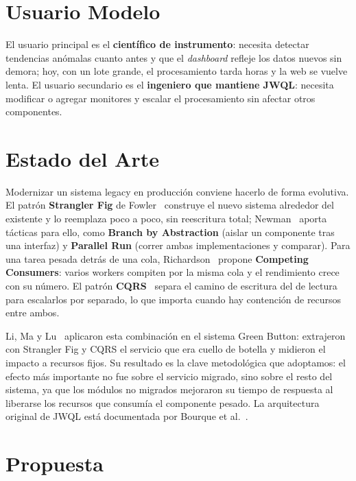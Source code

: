 \documentclass[conference]{IEEEtran}
\begin{document}
\section{Usuario Modelo}

El usuario principal es el \textbf{cient\'ifico de instrumento}: necesita detectar tendencias an\'omalas cuanto antes y que el \textit{dashboard} refleje los datos nuevos sin demora; hoy, con un lote grande, el procesamiento tarda horas y la web se vuelve lenta. El usuario secundario es el \textbf{ingeniero que mantiene JWQL}: necesita modificar o agregar monitores y escalar el procesamiento sin afectar otros componentes.

\section{Estado del Arte}

Modernizar un sistema legacy en producci\'on conviene hacerlo de forma evolutiva. El patr\'on \textbf{Strangler Fig} de Fowler~\cite{fowler2004} construye el nuevo sistema alrededor del existente y lo reemplaza poco a poco, sin reescritura total; Newman~\cite{newman2019} aporta t\'acticas para ello, como \textbf{Branch by Abstraction} (aislar un componente tras una interfaz) y \textbf{Parallel Run} (correr ambas implementaciones y comparar). Para una tarea pesada detr\'as de una cola, Richardson~\cite{richardson2018} propone \textbf{Competing Consumers}: varios workers compiten por la misma cola y el rendimiento crece con su n\'umero. El patr\'on \textbf{CQRS}~\cite{youngcqrs} separa el camino de escritura del de lectura para escalarlos por separado, lo que importa cuando hay contenci\'on de recursos entre ambos.

Li, Ma y Lu~\cite{lima2020} aplicaron esta combinaci\'on en el sistema Green Button: extrajeron con Strangler Fig y CQRS el servicio que era cuello de botella y midieron el impacto a recursos fijos. Su resultado es la clave metodol\'ogica que adoptamos: el efecto m\'as importante no fue sobre el servicio migrado, sino sobre el resto del sistema, ya que los m\'odulos no migrados mejoraron su tiempo de respuesta al liberarse los recursos que consum\'ia el componente pesado. La arquitectura original de JWQL est\'a documentada por Bourque et al.~\cite{bourque2020}.

\section{Propuesta}
\end{document}
